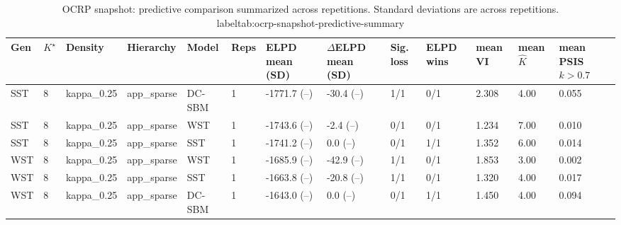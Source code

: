 \begin{table}[!h]
\centering
\caption{OCRP snapshot: predictive comparison summarized across repetitions. Standard deviations are across repetitions.\\label{tab:ocrp-snapshot-predictive-summary}}
\centering
\begin{tabular}[t]{lllllllllllll}
\toprule
Gen & $K^\star$ & Density & Hierarchy & Model & Reps & ELPD mean (SD) & $\Delta$ELPD mean (SD) & Sig. loss & ELPD wins & mean VI & mean $\hat K$ & mean PSIS $k>0.7$\\
\midrule
SST & 8 & kappa_0.25 & app_sparse & DC-SBM & 1 & -1771.7 (--) & -30.4 (--) & 1/1 & 0/1 & 2.308 & 4.00 & 0.055\\
SST & 8 & kappa_0.25 & app_sparse & WST & 1 & -1743.6 (--) & -2.4 (--) & 0/1 & 0/1 & 1.234 & 7.00 & 0.010\\
SST & 8 & kappa_0.25 & app_sparse & SST & 1 & -1741.2 (--) & 0.0 (--) & 0/1 & 1/1 & 1.352 & 6.00 & 0.014\\
WST & 8 & kappa_0.25 & app_sparse & WST & 1 & -1685.9 (--) & -42.9 (--) & 1/1 & 0/1 & 1.853 & 3.00 & 0.002\\
WST & 8 & kappa_0.25 & app_sparse & SST & 1 & -1663.8 (--) & -20.8 (--) & 1/1 & 0/1 & 1.320 & 4.00 & 0.017\\
WST & 8 & kappa_0.25 & app_sparse & DC-SBM & 1 & -1643.0 (--) & 0.0 (--) & 0/1 & 1/1 & 1.450 & 4.00 & 0.094\\
\bottomrule
\end{tabular}
\end{table}
